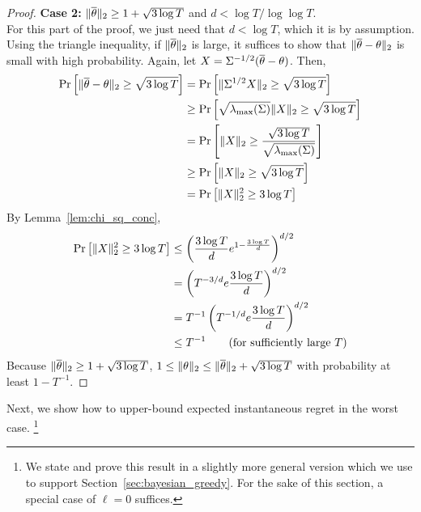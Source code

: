 \begin{proof}
  \textbf{Case 2:} $\|\overline \theta\|_2 \ge 1 + \sqrt{3 \log T}$ and $d < \log T/\log
  \log T$. \\
  For this part of the proof, we just need that $d < \log T$, which it is by
  assumption. Using the triangle inequality, if $\|\overline \theta\|_2$ is large, it
  suffices to show that $\|\overline \theta - \theta\|_2$ is small with high probability.
  Again, let $X = \Sigma^{-1/2} (\overline \theta - \theta)$. Then,
  \begin{align*}
    \Pr\left[\|\overline \theta - \theta\|_2 \ge \sqrt{3 \log T}\right]
    &= \Pr\left[\|\Sigma^{1/2} X\|_2 \ge \sqrt{3 \log T}\right] \\
    &\ge \Pr\left[\sqrt{\lambda_{\max}(\Sigma)} \|X\|_2 \ge \sqrt{3 \log T}\right] \\
    &= \Pr\left[\|X\|_2 \ge \frac{\sqrt{3 \log T}}{\sqrt{\lambda_{\max}(\Sigma)}}\right] \\
    &\ge \Pr\left[\|X\|_2 \ge \sqrt{3 \log T}\right] \\
    &= \Pr\left[\|X\|_2^2 \ge 3 \log T\right]
  \end{align*}
  By Lemma~\ref{lem:chi_sq_conc},
  \begin{align*}
    \Pr\left[\|X\|_2^2 \ge 3 \log T\right]
    &\le \left(\frac{3\log T}{d} e^{1-\frac{3\log T}{d}}\right)^{d/2} \\
    &= \left(T^{-3/d}e \frac{3\log T}{d}\right)^{d/2} \\
    &= T^{-1} \left(T^{-1/d}e \frac{3\log T}{d}\right)^{d/2} \\
    &\le T^{-1} \tag{for sufficiently large
    $T$} \end{align*}
  Because $\|\overline \theta\|_2 \ge 1 + \sqrt{3 \log T}$, $1 \le \|\theta\|_2 \le
  \|\overline \theta\|_2 + \sqrt{3 \log T}$ with probability at least $1-T^{-1}$.
\end{proof}

Next, we show how to upper-bound expected instantaneous regret in the worst case.%
\footnote{We state and prove this result in a slightly more general version which we use to support Section~\ref{sec:bayesian_greedy}. For the sake of this section, a special case of $\ell=0$ suffices.}

